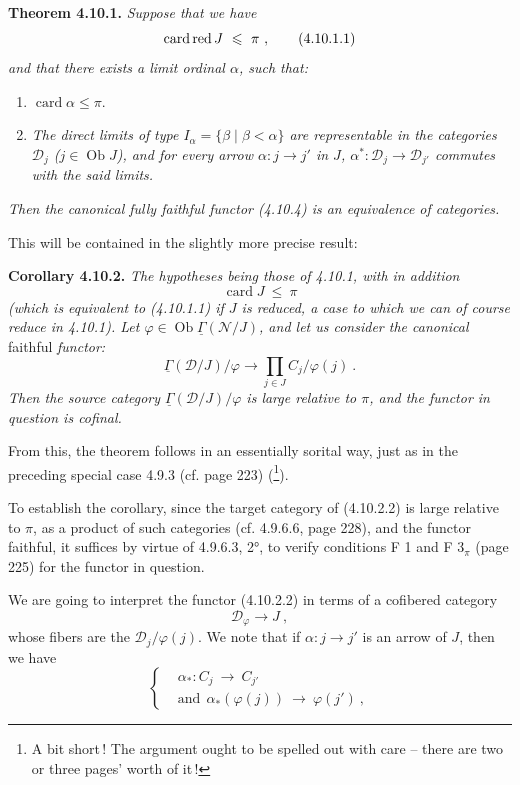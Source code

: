 \documentclass[11pt]{article}
\newcommand{\printedpage}[1]{\marginpar{\footnotesize p.~#1}}
\newcommand{\msp}[1]{\marginpar{\footnotesize [#1]}}
\newcommand{\uGamma}{\underline{\Gamma}}
\newcommand{\Ob}{\operatorname{Ob}}
\newcommand{\card}{\operatorname{card}}
\begin{document}
\printedpage{92}

\textbf{Theorem 4.10.1.} \textit{Suppose that we have}
\[
\mathrm{card}\,\textup{red}\, J \ \leqslant \ \pi \ , \tag*{(4.10.1.1)}
\]
\textit{and that there exists a limit ordinal $\alpha$, such that:}
\begin{enumerate}[label={}, leftmargin=3em]
\item[\textit{1)}] $\card \alpha \leqslant \pi$.
\item[\textit{2)}] \textit{The direct limits of}
\msp{page 245}
\textit{type $I_\alpha = \{\beta \mid \beta < \alpha\}$ are representable in the categories $\mathcal{D}_j$ ($j \in \Ob J$), and for every arrow $\alpha : j \longrightarrow j'$ in $J$, $\alpha^* : \mathcal{D}_j \longrightarrow \mathcal{D}_{j'}$ commutes with the said limits.}
\end{enumerate}
\textit{Then the canonical fully faithful functor (4.10.4) is an equivalence of categories.}

This will be contained in the slightly more precise result:

\textbf{Corollary 4.10.2.} \textit{The hypotheses being those of 4.10.1, with in addition}
\[
\card J \ \leqslant \ \pi \tag*{(4.10.2.1)}
\]
\textit{(which is equivalent to (4.10.1.1) if $J$ is reduced, a case to which we can of course reduce in 4.10.1). Let $\varphi \in \Ob \uGamma(\mathcal{N}/J)$, and let us consider the canonical} faithful \textit{functor:}
\[
\uGamma(\mathcal{D}/J)/\varphi \longrightarrow \prod_{j\in J} C_j/\varphi(j) \ . \tag*{(4.10.2.2)}
\]
\textit{Then the source category $\uGamma(\mathcal{D}/J)/\varphi$ is large relative to $\pi$, and the functor in question is cofinal.}

\msp{page 246}
From this, the theorem follows in an essentially sorital way, just as in the preceding special case 4.9.3 (cf. page 223) (\footnote{A bit short\,! The argument ought to be spelled out with care – there are two or three pages' worth of it\,!}).

To establish the corollary, since the target category of (4.10.2.2) is large relative to $\pi$, as a product of such categories (cf. 4.9.6.6, page 228), and the functor faithful, it suffices by virtue of 4.9.6.3, 2°, to verify conditions F 1 and F 3$_\pi$ (page 225) for the functor in question.

We are going to interpret the functor (4.10.2.2) in terms of a cofibered category
\[
\mathcal{D}_\varphi \longrightarrow J \ , \tag*{(4.10.5)}
\]
whose fibers are the $\mathcal{D}_j/\varphi(j)$. We note that if $\alpha : j \longrightarrow j'$ is an arrow of $J$, then we have
\[
\left\{
\begin{aligned}
&\alpha_* : C_j \ \longrightarrow \ C_{j'} \\
&\text{and} \ \ \alpha_*(\varphi(j)) \ \longrightarrow \ \varphi(j') \ ,
\end{aligned}
\right.
\]
\end{document}
